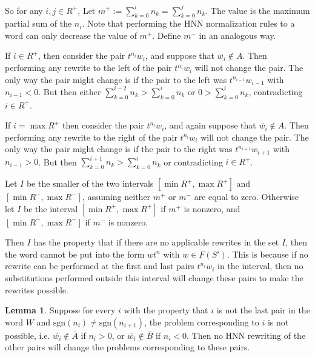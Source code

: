 \documentclass[12pt]{article} %
\theoremstyle{definition}
\theoremstyle{definition}
\theoremstyle{definition}
\newtheorem{lemma}{Lemma}[theorem]
\theoremstyle{definition}
\theoremstyle{definition}
\theoremstyle{definition}
\begin{document}
So for any $i, j \in R^{+}$, Let $m^{+} :=
\sum_{k=0}^i n_k = \sum_{k=0}^j n_k$. The value
is the maximum partial sum of the $n_i$. Note that performing the HNN
normalization rules to a word can only decrease the value of $m^{+}$.
Define $m^{-}$ in an analogous way.

If $i \in R^{+}$, then consider the pair $t^{n_i}w_i$, and suppose that
$\overline{w_i} \notin A$. Then performing any rewrite to the left of the
pair $t^{n_i}w_i$ will not change the pair. The only way the pair might change
is if the pair to the left was $t^{n_{i-1}}w_{i-1}$ with $n_{i-1} < 0$.
But then either $\sum_{k=0}^{i-2} n_k > \sum_{k=0}^i n_k$ or $0 > \sum_{k=0}^i n_k$,
contradicting $i \in R^{+}$.

If $i = \max R^{+}$ then consider the pair $t^{n_i}w_i$, and again suppose that
$\overline{w_i} \notin A$. Then performing any rewrite to the right of the
pair $t^{n_i}w_i$ will not change the pair. The only way the pair might change
is if the pair to the right was $t^{n_{i+1}}w_{i+1}$ with $n_{i-1} > 0$.
But then $\sum_{k=0}^{i+1} n_k > \sum_{k=0}^i n_k$ or contradicting $i \in R^{+}$.

Let $I$ be the smaller of the two intervals $[\min R^+, \max R^+]$ and
$[\min R^{-}, \max R^-]$, assuming neither $m^+$ or $m^-$ are equal to zero.
Otherwise let $I$ be the interval $[\min R^+, \max R^+]$ if $m^+$ is nonzero,
and $[\min R^-, \max R^-]$ if $m^-$ is nonzero.

Then $I$ has the property that if there are no applicable rewrites
in the set $I$, then the word cannot be put into the form $wt^n$ with $w \in F(S')$.
This is because if no rewrite can be performed
at the first and last pairs $t^{n_i}w_i$
in the interval, then no substitutions performed outside this interval will
change these pairs to make the rewrites possible.

\begin{lemma}\label{signseq}
Suppose for every $i$ with the property that $i$ is not
the last pair in the word $W$ and $\text{sgn}(n_i) \ne \text{sgn}(n_{i+1})$,
the problem corresponding to $i$ is not possible, i.e. $\overline{w_i} \notin \overline{A}$
if $n_i > 0$, or $\overline{w_i}
\notin \overline{B}$ if $n_i < 0$. Then no HNN rewriting of the other pairs will
change the problems corresponding to these pairs.
\end{lemma}
\end{document}
